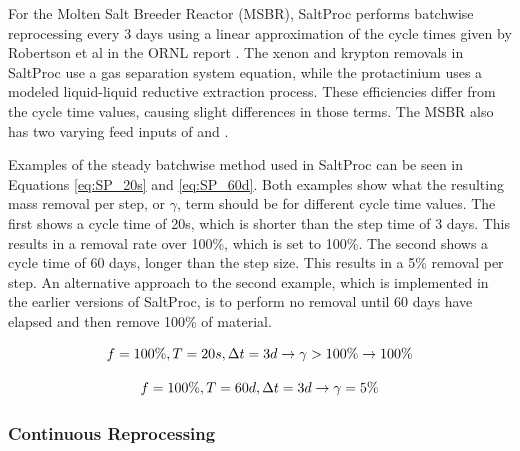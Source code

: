 For the Molten Salt Breeder Reactor (MSBR), SaltProc performs batchwise reprocessing every 3 days using a linear approximation of the cycle times given by Robertson et al in the ORNL report \cite{robertson_conceptual_1971, rykhlevskii_modeling_2019}. The xenon and krypton removals in SaltProc use a gas separation system equation, while the protactinium uses a modeled liquid-liquid reductive extraction process. These efficiencies differ from the cycle time values, causing slight differences in those terms. The MSBR also has two varying feed inputs of  and .

Examples of the steady batchwise method used in SaltProc can be seen in Equations \eqref{eq:SP_20s} and \eqref{eq:SP_60d}. Both examples show what the resulting mass removal per step, or $\gamma$, term should be for different cycle time values. The first shows a cycle time of 20s, which is shorter than the step time of 3 days. This results in a removal rate over 100\%, which is set to 100\%. The second shows a cycle time of 60 days, longer than the step size. This results in a 5\% removal per step. An alternative approach to the second example, which is implemented in the earlier versions of SaltProc, is to perform no removal until 60 days have elapsed and then remove 100\% of material.

\begin{equation} \hfill
f = 100\%, T = 20 s, \Delta t = 3 d \rightarrow \gamma > 100\% \rightarrow 100\% 
\hfill\label{eq:SP_20s} \end{equation}

\begin{equation} \hfill
f = 100\%, T = 60 d, \Delta t = 3 d \rightarrow \gamma = 5\%
\hfill\label{eq:SP_60d} \end{equation}

\subsubsection{Continuous Reprocessing}

